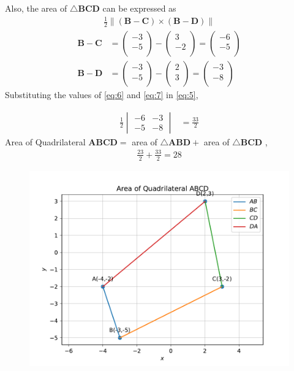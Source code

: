 \documentclass[12pt]{article}
\newcommand{\mydet}[1]{\ensuremath{\begin{vmatrix}#1\end{vmatrix}}}
\providecommand{\brak}[1]{\ensuremath{\left(#1\right)}}
\providecommand{\norm}[1]{\left\lVert#1\right\rVert}
\newcommand{\myvec}[1]{\ensuremath{\begin{pmatrix}#1\end{pmatrix}}}
\let\vec\mathbf
\begin{document}
\begin{enumerate}
Also, the area of $\triangle \vec{B}\vec{C}\vec{D}$ can be expressed as
  \begin{align}
  \frac{1}{2} \norm{\brak{\vec{B}-\vec{C}}  \times 
   \brak{\vec{B}- \vec{D}}} \label{eq:5}
\end{align}
\begin{align}
	\vec{B}- \vec{C} &= \myvec{-3\\-5\\}-\myvec{3\\-2\\}=\myvec{-6\\-5\\}\label{eq:6} \\
	  \vec{B}- \vec{D} &= \myvec{-3\\-5\\}-\myvec{2\\3\\}=\myvec{-3\\-8\\}\label{eq:7} 
  \end{align}
		Substituting the values of \eqref{eq:6} and \eqref{eq:7} in \eqref{eq:5},

		\begin{align}
	\frac{1}{2}\mydet{-6 & -3\\-5 & -8}  
	&=	\frac{33}{2}
\end{align}
		Area of Quadrilateral $\vec{A}\vec{B}\vec{C}\vec{D} = $ area of $\triangle \vec{A}\vec{B}\vec{D} + $ area of $\triangle \vec{B}\vec{C}\vec{D}$ ,
\begin{align}
	\frac{23}{2}+\frac{33}{2} = 28
\end{align}
\begin{figure}[!h]
 \begin{center}
  \includegraphics[width=\columnwidth]{figs/fig.pdf}
 \end{center}
\caption{}
\label{fig:Fig1}
\end{figure}
\end{enumerate}
\end{document}

